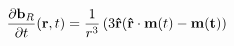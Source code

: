 \vspace{-0.1cm}
\begin{equation}
    \frac{\partial \mathbf{b}_R}{\partial t}(\mathbf{r}, t) =
    \frac{1}{r^3}\left(3\mathbf{\hat{r}} (\mathbf{\hat{r}} \cdot \mathbf{m}(t) - \mathbf{m(t)}\right)
    \label{eq:uxo-data}
    \vspace{-0.05cm}
\end{equation}
